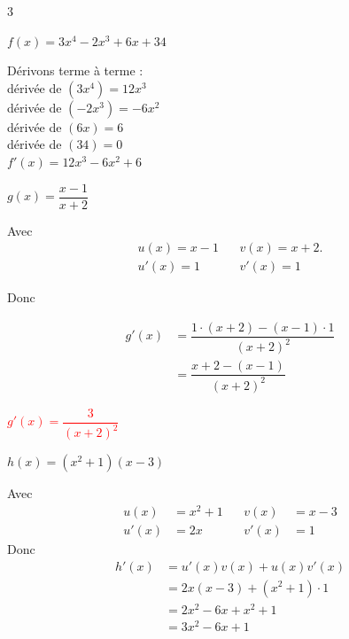 \documentclass[11pt,a4paper]{article}
\begin{document}
\begin{multicols}{3}
\begin{center}
$f(x)=3x^4-2x^3+6x+34$

\begin{tcolorbox}[colback=red!5!white,colframe=red!75!black]
{
Dérivons terme à terme : \\[3mm]

dérivée de $(3x^4)=12x^3$ \\[3mm]
dérivée de $(-2x^3)=-6x^2$ \\[3mm]
dérivée de $(6x)=6$ \\[3mm]
dérivée de $(34)=0$ \\[5mm]

$f'(x)=12x^3-6x^2+6$

 \vspace{10mm} 

}

\end{tcolorbox}
\end{center}


\columnbreak

\begin{center}
$g(x)=\dfrac{x-1}{x+2}$

\begin{tcolorbox}[colback=red!5!white,colframe=red!75!black]
{ Avec 
\[
\begin{aligned}
u(x)=x-1 & ~~~~v(x)=x+2. \\
u'(x)=1 & ~~~~v'(x)=1
\end{aligned}
\]

Donc

\[
\begin{aligned}
g'(x) &= \dfrac{1\cdot(x+2)-(x-1)\cdot 1}{(x+2)^2} \\
      &= \dfrac{x+2-(x-1)}{(x+2)^2}
\end{aligned}
\]


\textbf{\textcolor{red}{$g'(x)=\dfrac{3}{(x+2)^2}$}} 
}
\end{tcolorbox}
\end{center}

\columnbreak

\begin{center}
$h(x)=(x^2+1)(x-3)$



\begin{tcolorbox}[colback=red!5!white,colframe=red!75!black]
{ Avec 
\[
\begin{aligned}
u(x) &= x^2+1 & ~~~~ v(x) &= x-3 \\
u'(x) &= 2x & ~~~~ v'(x) &= 1
\end{aligned}
\]
Donc
\[
\begin{aligned}
h'(x) &= u'(x)v(x) + u(x)v'(x) \\
      &= 2x(x-3) + (x^2+1)\cdot 1 \\
      &= 2x^2 - 6x + x^2 + 1 \\
      &= 3x^2 - 6x + 1
\end{aligned}
\]

}
\end{tcolorbox}
\end{center}
\end{multicols}
\end{document}
